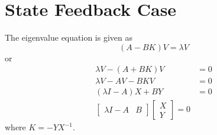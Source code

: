 \section{State Feedback Case}
The eigenvalue equation is given as
\begin{equation}
    (A-BK)V=\lambda V
\end{equation}
or 
\begin{equation}
\begin{split}
    \lambda V-(A+BK)V&=0\\
    \lambda V-AV-BKV&=0\\
    (\lambda I-A)X+BY&=0\\
    \begin{bmatrix}
        \lambda I-A& B
    \end{bmatrix}\begin{bmatrix}
        X\\Y
    \end{bmatrix}=0
\end{split}
\end{equation}
where $K=-YX^{-1}$.

